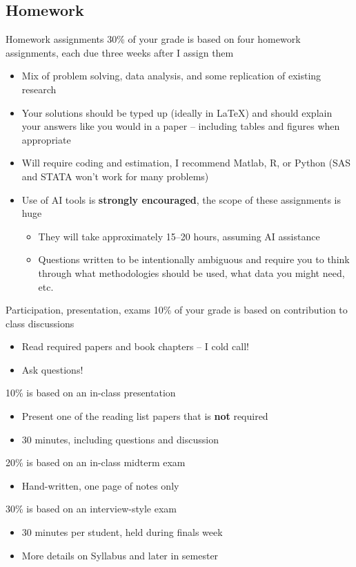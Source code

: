 \documentclass[xcolor=table, aspectratio=169]{beamer}
\begin{document}
\subsection{Homework}
\begin{frame}{Homework assignments}
30\% of your grade is based on four homework assignments, each due three weeks after I assign them
\begin{itemize}
\item Mix of problem solving, data analysis, and some replication of existing research
\item Your solutions should be typed up (ideally in LaTeX) and should explain your answers like you would in a paper -- including tables and figures when appropriate
\item Will require coding and estimation, I recommend Matlab, R, or Python (SAS and STATA won't work for many problems)
\item Use of AI tools is \textbf{strongly encouraged}, the scope of these assignments is huge
\begin{itemize}
    \item They will take approximately 15--20 hours, assuming AI assistance
    \item Questions written to be intentionally ambiguous and require you to think through what methodologies should be used, what data you might need, etc.
\end{itemize}
\end{itemize}
\end{frame}

\begin{frame}{Participation, presentation, exams}
10\% of your grade is based on contribution to class discussions
\begin{itemize}
\item Read required papers and book chapters -- I cold call!
\item Ask questions!
\end{itemize}
\vskip 8pt
10\% is based on an in-class presentation
\begin{itemize}
\item Present one of the reading list papers that is \textbf{not} required
\item 30 minutes, including questions and discussion
\end{itemize}
\vskip 8pt
20\% is based on an in-class midterm exam
\begin{itemize}
    \item Hand-written, one page of notes only
\end{itemize}
\vskip 8pt
30\% is based on an interview-style exam
\begin{itemize}
\item 30 minutes per student, held during finals week
\item More details on Syllabus and later in semester
\end{itemize}
\end{frame}
\end{document}
